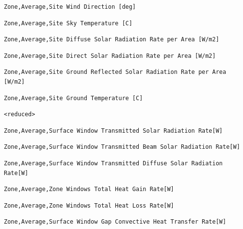 \begin{lstlisting}
Zone,Average,Site Wind Direction [deg]
\end{lstlisting}

\begin{lstlisting}
Zone,Average,Site Sky Temperature [C]
\end{lstlisting}

\begin{lstlisting}
Zone,Average,Site Diffuse Solar Radiation Rate per Area [W/m2]
\end{lstlisting}

\begin{lstlisting}
Zone,Average,Site Direct Solar Radiation Rate per Area [W/m2]
\end{lstlisting}

\begin{lstlisting}
Zone,Average,Site Ground Reflected Solar Radiation Rate per Area [W/m2]
\end{lstlisting}

\begin{lstlisting}
Zone,Average,Site Ground Temperature [C]
\end{lstlisting}

\begin{lstlisting}
<reduced>
\end{lstlisting}

\begin{lstlisting}
Zone,Average,Surface Window Transmitted Solar Radiation Rate[W]
\end{lstlisting}

\begin{lstlisting}
Zone,Average,Surface Window Transmitted Beam Solar Radiation Rate[W]
\end{lstlisting}

\begin{lstlisting}
Zone,Average,Surface Window Transmitted Diffuse Solar Radiation Rate[W]
\end{lstlisting}

\begin{lstlisting}
Zone,Average,Zone Windows Total Heat Gain Rate[W]
\end{lstlisting}

\begin{lstlisting}
Zone,Average,Zone Windows Total Heat Loss Rate[W]
\end{lstlisting}

\begin{lstlisting}
Zone,Average,Surface Window Gap Convective Heat Transfer Rate[W]
\end{lstlisting}

